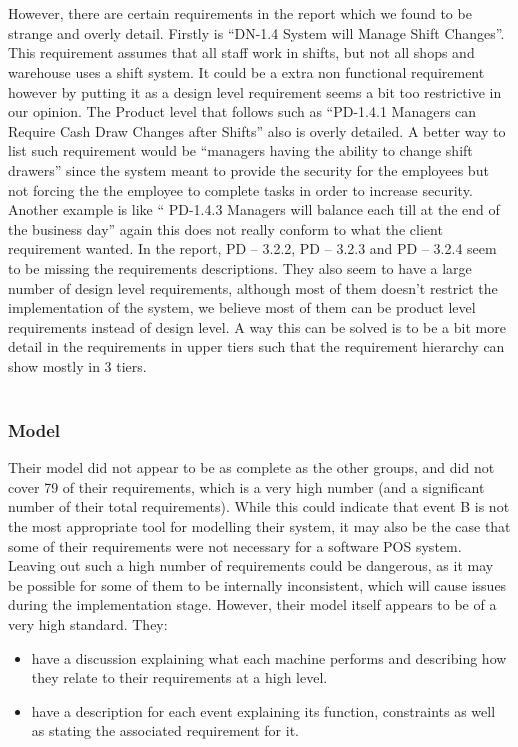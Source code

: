 \documentclass[a4paper]{article}
\begin{document}
\\\\
However, there are certain requirements in the report which we found to be strange and overly detail. Firstly is “DN-1.4 System will Manage Shift Changes”. This requirement assumes that all staff work in shifts, but not all shops and warehouse uses a shift system. It could be a extra non functional requirement however by putting it as a design level requirement seems a bit too restrictive in our opinion. The Product level that follows such as “PD-1.4.1 Managers can Require Cash Draw Changes after Shifts” also is overly detailed. A better way to list such requirement would be “managers having the ability to change shift drawers” since the system meant to provide the security for the employees but not forcing the the employee to complete tasks in order to increase security. Another example is like “ PD-1.4.3 Managers will balance each till at the end of the business day” again this does not really conform to what the client requirement wanted.
In the report, PD – 3.2.2, PD – 3.2.3 and PD – 3.2.4 seem to be missing the requirements descriptions. They also seem to have a large number of design level requirements, although most of them doesn’t restrict the implementation of the system, we believe most of them can be product level requirements instead of design level. A way this can be solved is to be a bit more detail in the requirements in upper tiers such that the requirement hierarchy can show mostly in 3 tiers. 
\\\\
\subsubsection{Model}

Their model did not appear to be as complete as the other groups, and did not cover 79 of their requirements, which is a very high number (and a significant number of their total requirements). 
While this could indicate that event B is not the most appropriate tool for modelling their system, it may also be the case that some of their requirements were not necessary for a software POS system.
Leaving out such a high number of requirements could be dangerous, as it may be possible for some of them to be internally inconsistent, which will cause issues during the implementation stage.
However, their model itself appears to be of a very high standard. They:
\begin{itemize}
\item have a discussion explaining what each machine performs and describing how they relate to their requirements at a high level.
\item have a description for each event explaining its function, constraints as well as stating the associated requirement for it.

\end{itemize}
\end{document}
